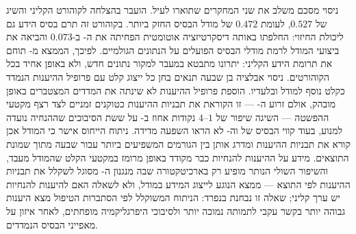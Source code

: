 ניסוי מסכם משלב את שני המחקרים שתוארו לעיל.  הועבר בהצלחה לקוהורט הקליני והשיג  של $0.527$, לעומת $0.472$ של מודל הבסיס החזק ביותר. בקוהורט זה תרם בסיס הידע גם ליכולת החיזוי: החלפתו באותה דיסקרטיזציה אוטומטית הפחיתה את ה- ב-$0.073$ והביאה את ביצועי המודל לרמת מודלי הבסיס הפועלים על הנתונים הגולמיים. לפיכך, הממצא מ- תוחם את תרומת הידע הקליני: יתרונו מתבטא במעבר למקור נתונים חדש, ולא באופן אחיד בכל הקוהורטים. ניסוי אבלציה בן שבעה תנאים בחן כל ייצוג קלט עם פרופיל ההיענות הנמדד כקלט נוסף למודל ובלעדיו. הוספת פרופיל ההיענות לא שינתה את המדדים המצטברים באופן מובהק, אולם זרוע ה- --- זו הקוראת את תבניות ההיענות כטוקנים זמניים לצד רצף מקטעי ההפשטה --- השיגה שיפור של $1$--$4$ נקודות אחוז ב- על ששת הסיבוכים שההנחיה נועדה למנוע, בעוד קווי הבסיס של  וה- לא הראו השפעה מדידה. ניתוח הייחוס אישר כי המודל אכן קורא את תבניות ההיענות ומדרג אותן בין הגורמים המשפיעים ביותר עבור שבעה מתוך שמונת התוצאים. מידע על ההיענות להנחיות כבר מקודד באופן מרומז במקטעי הקלט שהמודל מעבד, והשיפור השולי הנותר מופיע רק בארכיטקטורה שבה מנגנון ה- מסוגל לשקלל את תבניות ההיענות לפי התוצא --- ממצא הנוגע לייצוג המידע במודל, ולא לשאלה האם להיענות להנחיות יש ערך קליני; שאלה זו נבחנת בנפרד: הניתוח המשוקלל לפי הסתברות הטיפול מצא היענות גבוהה יותר בקשר עקבי לתמותה נמוכה יותר ולסיבוכי היפרגליקמיה מופחתים, לאחר איזון על מאפייני הבסיס הנמדדים.

\endgroup
{}
